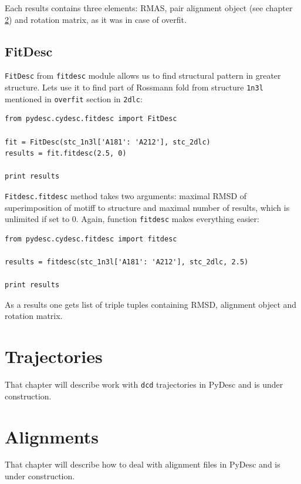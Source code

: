 \documentclass{article}
\begin{document}
Each results contains three elements: RMAS, pair alignment object (see chapter \ref{ALGsec}) and rotation matrix, as it was in case of overfit.

%
%
\subsection{FitDesc}

\texttt{FitDesc} from \texttt{fitdesc} module allows us to find structural pattern in greater structure. Lets use it to find part of Rossmann fold from structure \texttt{1n3l} mentioned in \texttt{overfit} section in \texttt{2dlc}:

\begin{lstlisting}
from pydesc.cydesc.fitdesc import FitDesc

fit = FitDesc(stc_1n3l['A181': 'A212'], stc_2dlc)
results = fit.fitdesc(2.5, 0)

print results
\end{lstlisting}

\texttt{Fitdesc.fitdesc} method takes two arguments: maximal RMSD of superimposition of motiff to structure and maximal number of results, which is unlimited if set to 0.
Again, function \texttt{fitdesc} makes everything easier:

\begin{lstlisting}
from pydesc.cydesc.fitdesc import fitdesc

results = fitdesc(stc_1n3l['A181': 'A212'], stc_2dlc, 2.5)

print results
\end{lstlisting}

As a results one gets list of triple tuples containing RMSD, alignment object and rotation matrix.


\section{Trajectories} \label{TRAJsec}

That chapter will describe work with \texttt{dcd} trajectories in PyDesc and is under construction.


\section{Alignments} \label{ALGsec}

That chapter will describe how to deal with alignment files in PyDesc and is under construction.
\end{document}
